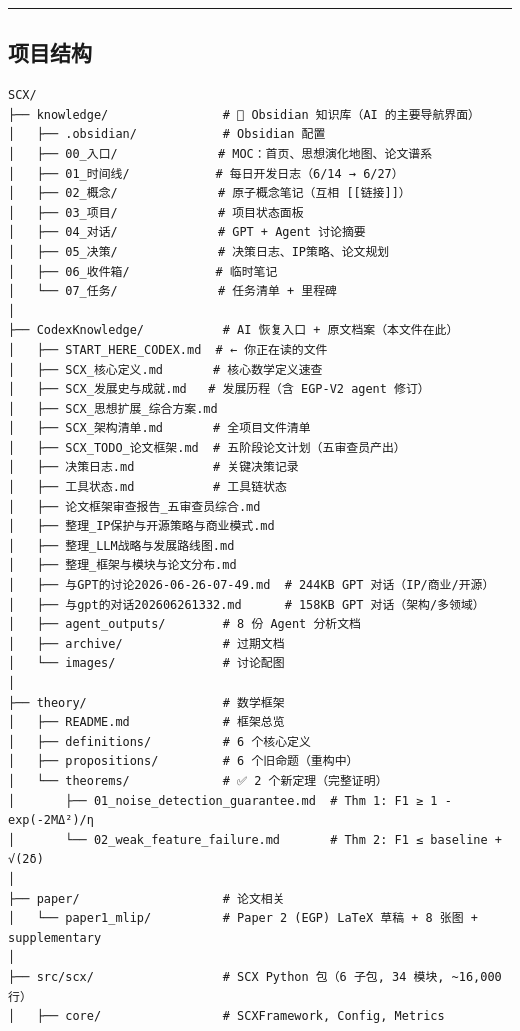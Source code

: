 \documentclass[
  12pt,
]{ctexart}
\begin{document}
\begin{center}\rule{0.5\linewidth}{0.5pt}\end{center}

\subsection{项目结构}\label{ux9879ux76eeux7ed3ux6784}

\begin{verbatim}
SCX/
├── knowledge/                # 📓 Obsidian 知识库（AI 的主要导航界面）
│   ├── .obsidian/            # Obsidian 配置
│   ├── 00_入口/              # MOC：首页、思想演化地图、论文谱系
│   ├── 01_时间线/            # 每日开发日志（6/14 → 6/27）
│   ├── 02_概念/              # 原子概念笔记（互相 [[链接]]）
│   ├── 03_项目/              # 项目状态面板
│   ├── 04_对话/              # GPT + Agent 讨论摘要
│   ├── 05_决策/              # 决策日志、IP策略、论文规划
│   ├── 06_收件箱/            # 临时笔记
│   └── 07_任务/              # 任务清单 + 里程碑
│
├── CodexKnowledge/           # AI 恢复入口 + 原文档案（本文件在此）
│   ├── START_HERE_CODEX.md  # ← 你正在读的文件
│   ├── SCX_核心定义.md       # 核心数学定义速查
│   ├── SCX_发展史与成就.md   # 发展历程（含 EGP-V2 agent 修订）
│   ├── SCX_思想扩展_综合方案.md
│   ├── SCX_架构清单.md       # 全项目文件清单
│   ├── SCX_TODO_论文框架.md  # 五阶段论文计划（五审查员产出）
│   ├── 决策日志.md           # 关键决策记录
│   ├── 工具状态.md           # 工具链状态
│   ├── 论文框架审查报告_五审查员综合.md
│   ├── 整理_IP保护与开源策略与商业模式.md
│   ├── 整理_LLM战略与发展路线图.md
│   ├── 整理_框架与模块与论文分布.md
│   ├── 与GPT的讨论2026-06-26-07-49.md  # 244KB GPT 对话（IP/商业/开源）
│   ├── 与gpt的对话202606261332.md      # 158KB GPT 对话（架构/多领域）
│   ├── agent_outputs/        # 8 份 Agent 分析文档
│   ├── archive/              # 过期文档
│   └── images/               # 讨论配图
│
├── theory/                   # 数学框架
│   ├── README.md             # 框架总览
│   ├── definitions/          # 6 个核心定义
│   ├── propositions/         # 6 个旧命题（重构中）
│   └── theorems/             # ✅ 2 个新定理（完整证明）
│       ├── 01_noise_detection_guarantee.md  # Thm 1: F1 ≥ 1 - exp(-2MΔ²)/η
│       └── 02_weak_feature_failure.md       # Thm 2: F1 ≤ baseline + √(2δ)
│
├── paper/                    # 论文相关
│   └── paper1_mlip/          # Paper 2 (EGP) LaTeX 草稿 + 8 张图 + supplementary
│
├── src/scx/                  # SCX Python 包（6 子包, 34 模块, ~16,000 行）
│   ├── core/                 # SCXFramework, Config, Metrics

\end{verbatim}
\end{document}
